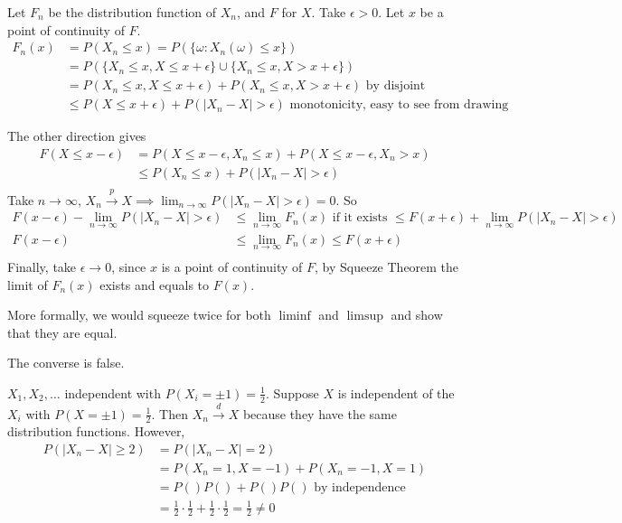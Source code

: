 \documentclass[class=article,crop=false]{standalone}
\begin{document}
\begin{prf}
Let $ F_n$ be the distribution function of $ X_n$, and $ F$ for  $ X$. Take $ \epsilon>0$. Let $ x$  be a point of continuity of $ F$. 
\begin{align*}
	F_n(x)&= P(X_n \leq x) = P(\{\omega:X_n(\omega) \leq x\} ) \\
	      &= P(\{X_n \leq x ,  X\leq x + \epsilon\} \cup  \{X_n \leq x ,  X>x+ \epsilon \}   ) \\
	      &= P(X_n \leq x ,X\leq x + \epsilon ) +P( X_n \leq x ,  X>x + \epsilon   ) \text{ by disjoint} \\
	      &\leq P(X \leq x + \epsilon ) + P(|X_n - X| > \epsilon) \text{ monotonicity, easy to see from drawing} 
\end{align*}

The other direction gives
\begin{align*}
	F(X\leq x- \epsilon) &=   P(X \leq x - \epsilon, X_n \leq x ) +P( X \leq x - \epsilon ,  X_n > x ) \\
			     &\leq P(X_n \leq x ) + P(|X_n - X| > \epsilon)  \\
\end{align*}
Take $ n \to \infty$, $ X_n \xrightarrow{ p} X \implies \lim_{ n \to \infty} P(|X_n -X|> \epsilon) =0 $. So
\begin{align*}
	F(x- \epsilon) - \lim_{ n \to \infty} P(|X_n -X| > \epsilon) &\leq \lim_{ n \to \infty}  F_n(x) \text{ if it exists }  \leq F(x+ \epsilon) + \lim_{ n \to \infty}  P(|X_n - X|> \epsilon)\\
	F(x- \epsilon) &\leq \lim_{ n \to \infty} F_n(x) \leq F(x+ \epsilon) \\
\end{align*}
Finally, take $ \epsilon \to 0$, since $ x$ is a point of continuity of  $ F$, by Squeeze Theorem the limit of  $ F_n(x)$ exists and equals to $ F(x)$.

 \begin{note}[]
More formally, we would squeeze twice for both $ \liminf$ and $  \limsup $ and show that they are equal.
\end{note}
\end{prf}

\begin{note}[]
The converse is false.
\end{note}
\begin{eg}[counterexample]
	$ X_1,X_2,\ldots$ independent with $ P(X_i = \pm 1) = \frac{1}{2}$. Suppose $ X$ is independent of the  $ X_i$ with $ P(X=\pm 1)=\frac{1}{2}$. Then $ X_n \xrightarrow{ d} X$ because they have the same distribution functions. However, 
	\begin{align*}
		P(|X_n-X|\geq 2) &= P(|X_n -X|=2) \\
				 &= P(X_n=1, X=-1) + P(X_n=-1, X=1) \\
				 &= P()P() + P()P() \text{ by independence}  \\
				 &= \frac{1}{2} \cdot \frac{1}{2} + \frac{1}{2} \cdot \frac{1}{2} =\frac{1}{2} \neq 0\\
	\end{align*} 
\end{eg}
\end{document}
